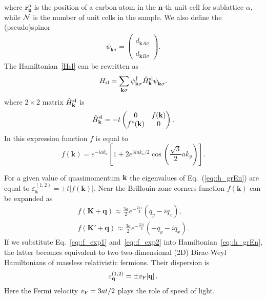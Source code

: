 \documentclass[prb,twocolumn,showpacs,aps,superscriptaddress,floatfix]{revtex4}
\begin{document}
where
$\mathbf{r}_{\mathbf{n}}^{\alpha}$
is the position of a carbon atom in the
$\mathbf{n}$-th
unit cell for sublattice $\alpha$, while
${\cal N}$
is the number of unit cells in the sample. We also define the
(pseudo)spinor
\begin{eqnarray}\label{eq::Psi}
\psi_{\mathbf{k} \sigma}^{\phantom{\dag}}=
\begin{pmatrix}
d_{\mathbf{k}A\sigma}^{\phantom{\dag}}\\
d_{\mathbf{k}B\sigma}^{\phantom{\dag}}
\end{pmatrix}.
\end{eqnarray}
The Hamiltonian~\eqref{Hsl} can be rewritten as
\begin{eqnarray}\label{eq::h_grEn}
H_{\rm sl}=\sum\limits_{\mathbf{k}\sigma}\psi_{\mathbf{k}\sigma}^{\dag}\hat{H}_{\mathbf{k}}^{\rm sl}\psi_{\mathbf{k}\sigma}^{\phantom{\dag}}.
\end{eqnarray}
where
$2\times2$
matrix
$\hat{H}_{\mathbf{k}}^{\rm sl}$
is
\begin{eqnarray}
\hat{H}_{\mathbf{k}}^{\rm sl}=-t\begin{pmatrix}
0&f(\mathbf{k})\\f^*(\mathbf{k})&0\end{pmatrix}.
\end{eqnarray}
In this expression function $f$ is equal to
\begin{equation}
f(\mathbf{k})=e^{-iak_x}\left[1+2e^{3iak_x/2}\cos\left(\frac{\sqrt{3}}{2}ak_y\right)\right].
\end{equation}

For a given value of quasimomentum
${\bf k}$
the eigenvalues of
Eq.~(\ref{eq::h_grEn}) are equal to
$\varepsilon_{\mathbf{k}}^{(1,2)}=\pm t|f(\mathbf{k})|$.
Near the Brillouin zone corners function
$f(\mathbf{k})$
can be expanded as
\begin{eqnarray}
\label{eq::f_exp1}
f(\mathbf{K}+\mathbf{q})
\approx
\frac{3a}{2} e^{-\frac{2\pi i}{3}}\left(q_y-iq_x\right),\;
\\
\label{eq::f_exp2}
f(\mathbf{K}'+\mathbf{q})
\approx
\frac{3a}{2} e^{-\frac{2\pi i}{3}}\left(-q_y-iq_x\right).
\end{eqnarray}
If we substitute
Eq.~\eqref{eq::f_exp1}
and~\eqref{eq::f_exp2}
into
Hamiltonian~\eqref{eq::h_grEn},
the latter becomes equivalent to two two-dimensional (2D) Dirac-Weyl
Hamiltonians of massless relativistic fermions. Their dispersion is
\begin{equation}
\varepsilon_{\textbf{q}}^{(1,2)}=\pm  v_{\rm F}|\textbf{q}|\,.
\end{equation}
Here the Fermi velocity
$v_{\rm F}=3at/2$
plays the role of speed of light.
\end{document}
